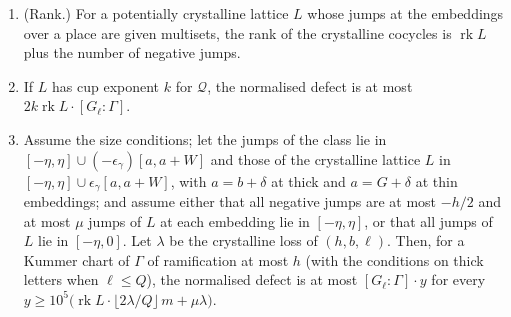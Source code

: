 \begin{theorem}\label{thm:crystalline-defect}
\begin{enumerate}[label=\textup{(\alph*)}]
\item (Rank.) For a potentially crystalline lattice $L$ whose jumps at the embeddings over a place are given multisets, the rank of the crystalline cocycles is $\operatorname{rk}L$ plus the number of negative jumps.
\item If $L$ has cup exponent $k$ for $\mathcal Q$, the normalised defect is at most $2k\operatorname{rk}L\cdot[G_\ell:\Gamma]$.
\item Assume the size conditions; let the jumps of the class lie in $[-\eta,\eta]\cup(-\epsilon_\gamma)[a,a+W]$ and those of the crystalline lattice $L$ in $[-\eta,\eta]\cup\epsilon_\gamma[a,a+W]$, with $a=b+\delta$ at thick and $a=G+\delta$ at
thin embeddings; and assume either that all negative jumps are at most $-h/2$ and at most $\mu$ jumps of $L$ at each embedding lie in $[-\eta,\eta]$, or that all jumps of $L$ lie in $[-\eta,0]$. Let $\lambda$ be the
crystalline loss of $(h,b,\ell)$. Then, for a Kummer chart of $\Gamma$ of ramification at most $h$ (with the conditions on thick letters when $\ell\le Q$), the normalised defect is at most $[G_\ell:\Gamma]\cdot y$ for every
$y\ge10^5\bigl(\operatorname{rk}L\cdot\lfloor2\lambda/Q\rfloor\,m+\mu\lambda\bigr)$.
\end{enumerate}
\end{theorem}

